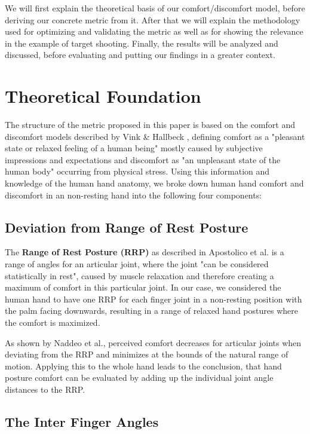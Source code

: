 \documentclass{sig-alternate-05-2015}
\begin{document}
We will first explain the theoretical basis of our comfort/discomfort model, before deriving our concrete metric from it. After that we will explain the methodology used for optimizing and validating the metric as well as for showing the relevance in the example of target shooting. Finally, the results will be analyzed and discussed, before evaluating and putting our findings in a greater context.


\section{Theoretical Foundation}
The structure of the metric proposed in this paper is based on the comfort and discomfort models described by Vink \& Hallbeck \cite{vink2012editorial}, defining comfort as a "pleasant state or relaxed feeling of a human being" mostly caused by subjective impressions and expectations and discomfort as "an unpleasant state of the human body" occurring from physical stress. Using this information and knowledge of the human hand anatomy, we broke down human hand comfort and discomfort in an non-resting hand into the following four components:

\subsection{Deviation from Range of Rest Posture}

The \textbf{Range of Rest Posture (RRP)} as described in Apostolico et al. \cite{apostolico2014postural} is a range of angles for an articular joint, where the joint "can be considered statistically in rest", caused by muscle relaxation and therefore creating a maximum of comfort in this particular joint. In our case, we considered the human hand to have one RRP for each finger joint in a non-resting position with the palm facing downwards, resulting in a range of relaxed hand postures where the comfort is maximized. 

As shown by Naddeo et al.\cite{naddeo2015proposal}, perceived comfort decreases for articular joints when deviating from the RRP and minimizes at the bounds of the natural range of motion. Applying this to the whole hand leads to the conclusion, that hand posture comfort can be evaluated by adding up the individual joint angle distances to the RRP.

\subsection{The Inter Finger Angles}
\end{document}
